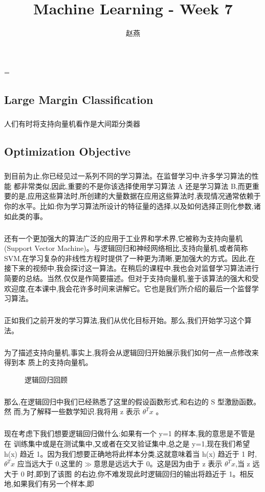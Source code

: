 \documentclass{article}
\title{Machine Learning - Week 7}
\author{赵燕}
\date{}
\begin{document}
 
\hfuzz=\maxdimen
{}
\begin{CJK}{UTF8}{gbsn} 
\maketitle
\renewcommand\contentsname{目录}
\renewcommand\figurename{图}
\tableofcontents
\newpage

\section{Large Margin Classification}
\subparagraph{}
人们有时将支持向量机看作是大间距分类器
\subsection{Optimization Objective}
\subparagraph{}
到目前为止,你已经见过一系列不同的学习算法。在监督学习中,许多学习算法的性能
都非常类似,因此,重要的不是你该选择使用学习算法 A 还是学习算法 B,而更重要的是,应用这些算法时,所创建的大量数据在应用这些算法时,表现情况通常依赖于你的水平。比如:你为学习算法所设计的特征量的选择,以及如何选择正则化参数,诸如此类的事。
\subparagraph{}
还有一个更加强大的算法广泛的应用于工业界和学术界,它被称为支持向量机(Support Vector Machine)。与逻辑回归和神经网络相比,支持向量机,或者简称SVM,在学习复杂的非线性方程时提供了一种更为清晰,更加强大的方式。因此,在接下来的视频中,我会探讨这一算法。在稍后的课程中,我也会对监督学习算法进行简要的总结。当然,仅仅是作简要描述。但对于支持向量机,鉴于该算法的强大和受欢迎度,在本课中,我会花许多时间来讲解它。它也是我们所介绍的最后一个监督学习算法。
\subparagraph{}
正如我们之前开发的学习算法,我们从优化目标开始。那么,我们开始学习这个算法。
\subparagraph{}
为了描述支持向量机,事实上,我将会从逻辑回归开始展示我们如何一点一点修改来得到本
质上的支持向量机。
\begin{figure}[H]
\caption{逻辑回归回顾}
\label{fig:701}
\end{figure}
\subparagraph{}
那么,在逻辑回归中我们已经熟悉了这里的假设函数形式,和右边的 S 型激励函数。然
而,为了解释一些数学知识.我将用 z 表示 $\theta^Tx$ 。
\subparagraph{}
现在考虑下我们想要逻辑回归做什么:如果有一个 y=1 的样本,我的意思是不管是在
训练集中或是在测试集中,又或者在交叉验证集中,总之是 y=1,现在我们希望 h(x) 趋近
1。因为我们想要正确地将此样本分类,这就意味着当 h(x) 趋近于 1 时, $\theta^Tx$ 应当远大于
0,这里的$\gg$意思是远远大于 0。这是因为由于 z 表示 $\theta^Tx$,当 z 远大于 0 时,即到了该图
的右边,你不难发现此时逻辑回归的输出将趋近于 1。相反地,如果我们有另一个样本,即

\end{CJK}
\end{document}
